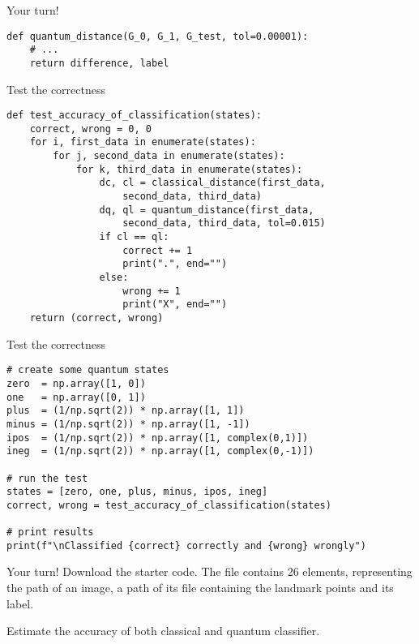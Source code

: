 \begin{frame}[fragile]{Your turn!}
\begin{verbatim}
def quantum_distance(G_0, G_1, G_test, tol=0.00001):
    # ...
    return difference, label
\end{verbatim}
\end{frame}

\begin{frame}[fragile]{Test the correctness}
\begin{verbatim}
def test_accuracy_of_classification(states):
    correct, wrong = 0, 0
    for i, first_data in enumerate(states):
        for j, second_data in enumerate(states):
            for k, third_data in enumerate(states):
                dc, cl = classical_distance(first_data,
                    second_data, third_data)
                dq, ql = quantum_distance(first_data,
                    second_data, third_data, tol=0.015)
                if cl == ql:
                    correct += 1
                    print(".", end="")
                else:
                    wrong += 1
                    print("X", end="")
    return (correct, wrong)
\end{verbatim}
\end{frame}

\begin{frame}[fragile]{Test the correctness}
\begin{verbatim}
# create some quantum states
zero  = np.array([1, 0])
one   = np.array([0, 1])
plus  = (1/np.sqrt(2)) * np.array([1, 1])
minus = (1/np.sqrt(2)) * np.array([1, -1])
ipos  = (1/np.sqrt(2)) * np.array([1, complex(0,1)])
ineg  = (1/np.sqrt(2)) * np.array([1, complex(0,-1)])

# run the test
states = [zero, one, plus, minus, ipos, ineg]
correct, wrong = test_accuracy_of_classification(states)

# print results
print(f"\nClassified {correct} correctly and {wrong} wrongly")
\end{verbatim}
\end{frame}

\begin{frame}{Your turn!}
Download the starter code. The file  contains 26 elements, representing the path of an image, a path of its file containing the landmark points and its label. 

\bigskip Estimate the accuracy of both classical and quantum classifier. 
\end{frame}